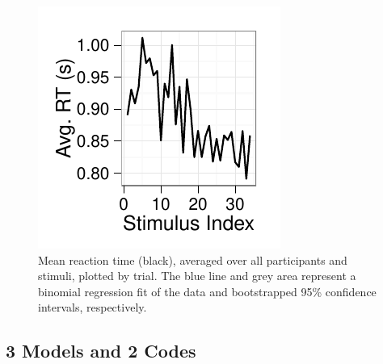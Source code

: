 \begin{figure}[tp]
    \includegraphics{f_all_mean_rt}
    \centering
    \caption{Mean reaction time (black), averaged over all participants and stimuli, plotted by trial.  The blue line and grey area represent a binomial regression fit of the data and bootstrapped 95\% confidence intervals, respectively.}
    \label{fig:meanrt}
\end{figure}

\subsection{3 Models and 2 Codes}
\label{sub:threemodels}
